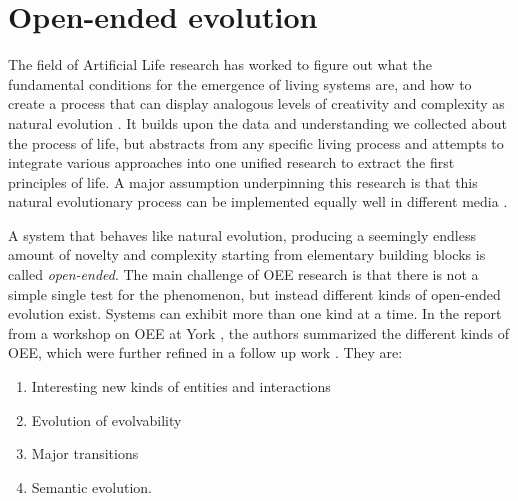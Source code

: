 \section{Open-ended evolution\label{sec:open-ended-evolution-1}}
The field of Artificial Life research has worked to figure out what the
fundamental conditions for the emergence of living systems are, and how to
create a process that can display analogous levels of creativity and complexity
as natural evolution \parencite{eigenHypercycle1979,
  langtonArtificialLifeProceedings1989, dysonOriginsLife1999,
  stanleyWhyOpenEndednessMatters2019, packardOverviewOpenEndedEvolution2019,
  sorosOpenendednessLastGrand2017}. It builds upon the data and understanding we
collected about the process of life, but abstracts from any specific living
process and attempts to integrate various approaches into one unified research
to extract the first principles of life. A major assumption underpinning this
research is that this natural evolutionary process can be implemented equally
well in different media \parencite{dennettDarwinDangerousIdea1996}.

A system that behaves like natural evolution, producing a seemingly endless
amount of novelty and complexity starting from elementary building blocks is
called \emph{open-ended}. The main challenge of \ac{OEE} research is that there is
not a simple single test for the phenomenon, but instead different kinds of
open-ended evolution exist. Systems can exhibit more than one kind at a time. In
the report from a workshop on \ac{OEE} at York
\parencite{taylorOpenEndedEvolutionPerspectives2016}, the authors summarized the
different kinds of \ac{OEE}, which were further refined in a follow up work
\parencite{packardOverviewOpenEndedEvolution2019}. They are:

\begin{enumerate}
  \item Interesting new kinds of entities and interactions
  \item Evolution of evolvability
  \item Major transitions
  \item Semantic evolution.
\end{enumerate}

